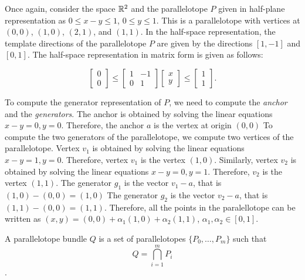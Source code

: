 \begin{example}
\label{ex:ptope}
Once again, consider the space ${\mathbb{R}}^2$ and the parallelotope $P$ given in half-plane representation as $0 \leq x-y \leq 1$, $0 \leq y \leq 1$.
%
This is a parallelotope with vertices at $(0,0)$, $(1,0)$, $(2,1)$, and $(1,1)$.
%
In the half-space representation, the template directions of the parallelotope $P$ are given by the directions $[1, -1]$ and $[0, 1]$.
%
The half-space representation in matrix form is given as follows:

\begin{equation}
  \begin{bmatrix} 0 \\ 0 \end{bmatrix} \leq \begin{bmatrix}  1 & -1 \\ 0 &  1 \end{bmatrix}  \begin{bmatrix} x \\ y \end{bmatrix} \leq \begin{bmatrix} 1 \\ 1 \end{bmatrix}. \label{eq:ptopeexample}
\end{equation}

To compute the generator representation of $P$, we need to compute the \emph{anchor} and the \emph{generators}.
%
The anchor is obtained by solving the linear equations $x-y = 0, y = 0$.
%
Therefore, the anchor $a$ is the vertex at origin $(0,0)$
%
To compute the two generators of the parallelotope, we compute two vertices of the parallelotope.
%
Vertex $v_1$ is obtained by solving the linear equations $x - y = 1, y = 0$.
%
Therefore, vertex $v_1$ is the vertex $(1,0)$.
%
Similarly, vertex $v_2$ is obtained by solving the linear equations $x-y = 0, y = 1$.
%
Therefore, $v_2$ is the vertex $(1,1)$.
%
The generator $g_1$ is the vector $v_1 - a$, that is $(1,0)- (0,0) = (1,0)$
%
The generator $g_2$ is the vector $v_2 - a$, that is $(1,1) - (0,0) = (1,1)$.
%
Therefore, all the points in the paralellotope can be written as $(x,y) = (0,0) + \alpha_1 (1,0) + \alpha_2(1,1)$, $\alpha_1, \alpha_2 \in [0,1]$.
\end{example}
%
%
\begin{definition}
A parallelotope bundle $Q$ is a set of parallelotopes $\{P_0, \ldots, P_m\}$ such that
  $$ Q = \bigcap_{i=1}^{m}P_i $$.
\end{definition}

